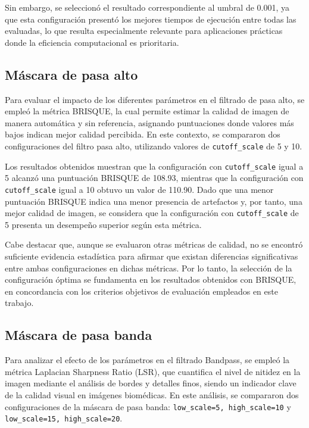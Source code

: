 Sin embargo, se seleccionó el resultado correspondiente al umbral de 0.001, ya que esta configuración presentó los mejores tiempos de ejecución entre todas las evaluadas, lo que resulta especialmente relevante para aplicaciones prácticas donde la eficiencia computacional es prioritaria.

\subsection{Máscara de pasa alto}

Para evaluar el impacto de los diferentes parámetros en el filtrado de pasa alto, se empleó la métrica BRISQUE, la cual permite estimar la calidad de imagen de manera automática y sin referencia, asignando puntuaciones donde valores más bajos indican mejor calidad percibida\cite{BRISQUE}. En este contexto, se compararon dos configuraciones del filtro pasa alto, utilizando valores de \texttt{cutoff\_scale} de 5 y 10.

Los resultados obtenidos muestran que la configuración con \texttt{cutoff\_scale} igual a 5 alcanzó una puntuación BRISQUE de 108.93, mientras que la configuración con \texttt{cutoff\_scale} igual a 10 obtuvo un valor de 110.90. Dado que una menor puntuación BRISQUE indica una menor presencia de artefactos y, por tanto, una mejor calidad de imagen, se considera que la configuración con \texttt{cutoff\_scale} de 5 presenta un desempeño superior según esta métrica.

Cabe destacar que, aunque se evaluaron otras métricas de calidad, no se encontró suficiente evidencia estadística para afirmar que existan diferencias significativas entre ambas configuraciones en dichas métricas. Por lo tanto, la selección de la configuración óptima se fundamenta en los resultados obtenidos con BRISQUE, en concordancia con los criterios objetivos de evaluación empleados en este trabajo.

\subsection{Máscara de pasa banda}

Para analizar el efecto de los parámetros en el filtrado Bandpass, se empleó la métrica Laplacian Sharpness Ratio (LSR), que cuantifica el nivel de nitidez en la imagen mediante el análisis de bordes y detalles finos, siendo un indicador clave de la calidad visual en imágenes biomédicas. En este análisis, se compararon dos configuraciones de la máscara de pasa banda: \texttt{low\_scale=5, high\_scale=10} y \texttt{low\_scale=15, high\_scale=20}.

